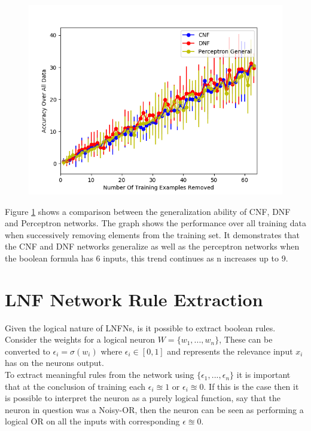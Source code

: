 \begin{figure}[H]
	\centering
	\begin{minipage}[b]{0.8\textwidth}
		\includegraphics[width=\textwidth]{6-generalization.png}
		\caption{}
		\label{fig:generalization-peformance-6}
	\end{minipage}
	\hfill
\end{figure}

Figure \ref{fig:generalization-peformance-6} shows a comparison between the generalization ability of CNF, DNF and Perceptron networks. The graph shows the performance over all training data when successively removing elements from the training set. It demonstrates that the CNF and DNF networks generalize as well as the perceptron networks when the boolean formula has 6 inputs, this trend continues as n increases up to 9.

\section{LNF Network Rule Extraction} \label{sec:lnfn-rule-extraction}
Given the logical nature of LNFNs, is it possible to extract boolean rules. Consider the weights for a logical neuron $W = \{w_1, ..., w_n\}$, These can be converted to $\epsilon_i = \sigma(w_i)$ where $\epsilon_i \in [0, 1]$ and represents the relevance input $x_i$ has on the neurons output.\\

To extract meaningful rules from the network using $\{ \epsilon_1, ..., \epsilon_n \}$ it is important that at the conclusion of training each $\epsilon_i \approxeq 1$ or $\epsilon_i \approxeq 0$. If this is the case then it is possible to interpret the neuron as a purely logical function, say that the neuron in question was a Noisy-OR, then the neuron can be seen as performing a logical OR on all the inputs with corresponding $\epsilon \approxeq 0$.\\

